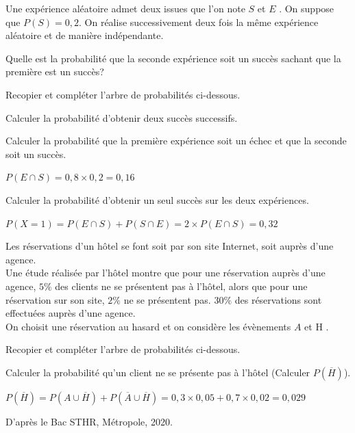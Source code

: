 \documentclass[11pt,a4paper]{article}  %
\begin{document}
Une expérience aléatoire admet deux issues que l'on note $S$  et $E$ . On suppose que $P(S)=0,2$. On réalise successivement deux fois la même expérience aléatoire et de manière indépendante.
\begin{enumMet}
	\item Quelle est la probabilité que la seconde expérience soit un succès sachant que la première est un succès? 
	\item Recopier et compléter l'arbre de probabilités ci-dessous.\\
	\item Calculer la probabilité d'obtenir deux succès successifs.\quad {}
	\item Calculer la probabilité que la première expérience soit un échec et que la seconde soit un succès.
	\begin{corrBox}
		$P(E\cap S)=0,8\times 0,2=0,16$
	\end{corrBox}
	\item Calculer la probabilité d'obtenir un seul succès sur les deux expériences.
	\begin{corrBox}
		$P(X=1)=P(E\cap S)+P(S\cap E)=2\times P(E\cap S)=0,32$
	\end{corrBox}
\end{enumMet}


Les réservations d'un hôtel se font soit par son site Internet, soit auprès d'une agence.\\
Une étude réalisée par l'hôtel montre que pour une réservation auprès d'une agence, $5 \%$ des clients ne se présentent pas à l'hôtel, alors que pour une réservation sur son site, $2 \%$ ne se présentent pas. $30 \%$ des réservations sont effectuées auprès d'une agence.\\
On choisit une réservation au hasard et on considère les évènements $A$  et $\mathrm{H}$ .\\
\begin{enumMet}
	\item Recopier et compléter l'arbre de probabilités ci-dessous.\\
	\item Calculer la probabilité qu'un client ne se présente pas à l'hôtel (Calculer $P(\overline{H})$).
	\begin{corrBox}
		$P(\overline{H})=P(A\cup\overline{H})+P(\overline{A}\cup\overline{H})=0,3\times0,05+0,7\times0,02=0,029$
	\end{corrBox}
\end{enumMet}
D'après le Bac STHR, Métropole, 2020.
\end{document}
